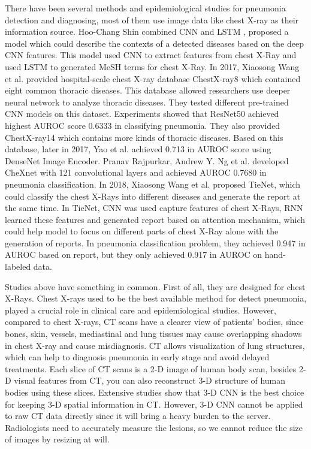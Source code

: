 \documentclass[journal]{IEEEtran}
\begin{document}
There have been several methods and epidemiological studies \cite{Franquet2001Imaging}\cite{Thomas2005Standardized}\cite{deepika2018classification} for pneumonia detection and diagnosing, most of them use image data like chest X-ray as their information source.
Hoo-Chang Shin \cite{Shin2016Learning} combined CNN and LSTM \cite{hochreiter1997long}, proposed a model which could describe the contexts of a detected diseases based on the deep CNN features. This model used CNN to extract features from chest X-Ray and used LSTM to generated MeSH \cite{timmurphy.org} terms for chest X-Ray. In 2017, Xiaosong Wang et al. \cite{Wang2017ChestX} provided hospital-scale chest X-ray database ChestX-ray8 which contained eight common thoracic diseases. This database allowed researchers use deeper neural network to analyze thoracic diseases. They tested different pre-trained CNN models on this dataset. Experiments showed that ResNet50 achieved highest AUROC score 0.6333 in classifying pneumonia. They also provided ChestX-ray14 which contains more kinds of thoracic diseases.
Based on this database, later in 2017, Yao et al. \cite{yao2017learning} achieved 0.713 in AUROC score using DenseNet Image Encoder. Pranav Rajpurkar, Andrew Y. Ng et al. \cite{Rajpurkar2017CheXNet} developed CheXnet with 121 convolutional layers and achieved AUROC 0.7680 in pneumonia classification.
In 2018, Xiaosong Wang et al. \cite{Wang2018TieNet} proposed TieNet, which could classify the chest X-Rays into different diseases and generate the report at the same time. In TieNet, CNN was used capture features of chest X-Rays, RNN learned these features and generated report based on attention mechanism, which could help model to focus on different parts of chest X-Ray alone with the generation of reports. In pneumonia classification problem, they achieved 0.947 in AUROC based on report, but they only achieved 0.917 in AUROC on hand-labeled data. 

Studies above have something in common. First of all, they are designed for chest X-Rays. Chest X-rays used to be the best available method for detect pneumonia, played a crucial role in clinical care\cite{Franquet2001Imaging} and epidemiological studies\cite{Thomas2005Standardized}. However, compared to chest X-rays, CT scans have a clearer view of patients' bodies, since bones, skin, vessels, mediastinal and lung tissues may cause overlapping shadows in chest X-ray and cause misdiagnosis. CT allows visualization of lung structures\cite{korfiatis2009texture}, which can help to diagnosis pneumonia in early stage and avoid delayed treatments.
Each slice of CT scans is a 2-D image of human body scan, besides 2-D visual features from CT, you can also reconstruct 3-D structure of human bodies using these slices. Extensive studies show that 3-D CNN is the best choice for keeping 3-D spatial information in CT\cite{Yorozu1987Electron}. However, 3-D CNN cannot be applied to raw CT data directly since it will bring a heavy burden to the server. Radiologists need to accurately measure the lesions, so we cannot reduce the size of images by resizing at will.
 
\end{document}
